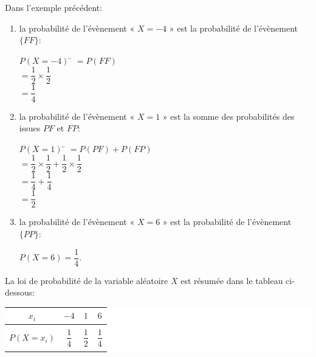 \documentclass[a4paper,11pt,cours]{nsi} %
\begin{document}
\begin{exemple}[]
	Dans l'exemple précédent:
	\begin{enumerate}[label=\textbullet]
		\item 		la probabilité de l'évènement « $X=-4$ » est la probabilité de l'évènement $\{FF\}$:
		\begin{tabbing}
			$P(X=-4)$	\= 	$=P(FF)$	\\[0.5em]
			\>		$=\dfrac{1}{2}\times\dfrac{1}{2}$	\\[0.5em]		
			\>		$=\dfrac{1}{4}$
		\end{tabbing}
		\item 		la probabilité de l'évènement « $X=1$ » est la somme des probabilités des issues $PF$ et $FP$:
		\begin{tabbing}
			$P(X=1)$		\= 	$=P(PF)+P(FP)$	\\[0.5em]
			\>		$=\dfrac{1}{2}\times\dfrac{1}{2}+\dfrac{1}{2}\times\dfrac{1}{2}$	\\[0.5em]
			\>		$=\dfrac{1}{4}+\dfrac{1}{4}$\\[0.5em]
			\>		$=\dfrac{1}{2}$
		\end{tabbing}
		\item 		la probabilité de l'évènement « $X=6$ » est la probabilité de l'évènement $\{PP\}$: 
		
		$P(X=6)=\dfrac{1}{4}$.
	\end{enumerate}			
	
	La loi de probabilité de la variable aléatoire $X$ est résumée dans le tableau ci-dessous:
	\begin{center}
		\colorbox{white}{
			\begin{tabular}{|c|c|c|c|}
				\hline
				{\boldmath $x_i$} & $-4$ & $1$ & $6$ \\
				\hline
				& & & \\
				{\boldmath $P(X=x_i)$} & $\dfrac{1}{4}$ & $\dfrac{1}{2}$ & $\dfrac{1}{4}$\\
				& & & \\			
				\hline
		\end{tabular}}
	\end{center}
\end{exemple}
\end{document}
